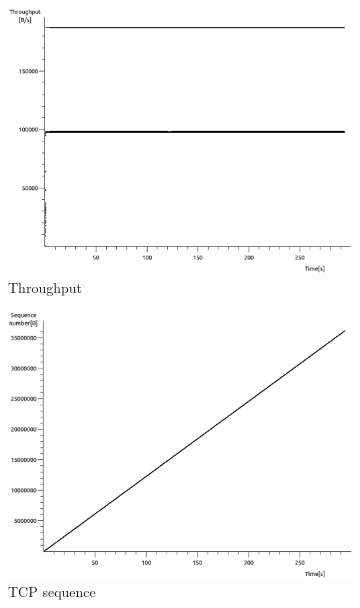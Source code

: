 \documentclass[conference,a4paper]{../../sty/IEEEtran}
\begin{document}
\begin{figure}
 \centering
 \begin{subfigure}[b]{0.2\textwidth}
  \includegraphics[width=\textwidth]{s1-0_thru}
  \caption{Throughput}
 \end{subfigure}
 \begin{subfigure}[b]{0.2\textwidth}
  \includegraphics[width=\textwidth]{s1-0_seq}
  \caption{TCP sequence}
 \end{subfigure}
 \begin{subfigure}[b]{0.2\textwidth}

\end{subfigure}
\end{figure}
\end{document}
